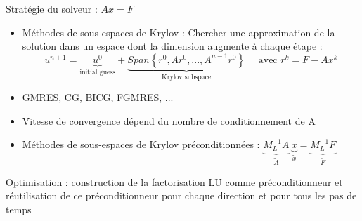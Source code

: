 \begin{frame}{Stratégie du solveur : $Ax=F$}

\begin{itemize}
\item Méthodes de sous-espaces de Krylov :
Chercher une approximation de la solution dans un espace dont la dimension augmente à chaque étape :
\begin{equation*}
  u^{n+1} = \underbrace{u^0}_{\text{initial guess}} + \underbrace{Span\left\{ r^0,Ar^0,...,A^{n-1}r^0 \right\}}_{\text{Krylov subspace}} \quad \text{ avec } r^k=F-Ax^k
\end{equation*}
\item GMRES, CG, BICG, FGMRES, ...
\item Vitesse de convergence dépend du nombre de conditionnement de A
\item Méthodes de sous-espaces de Krylov préconditionnées :
 $\underbrace{M_L^{-1} A}_{\tilde{A}} \ \underbrace{x}_{\tilde{x}} = \underbrace{M_L^{-1} F}_{\tilde{F}}  $



\end{itemize}

\begin{alert}{Optimisation :}
construction de la factorisation LU comme préconditionneur et réutilisation de ce préconditionneur
pour chaque direction et pour tous les pas de temps
\end{alert}



\end{frame}



